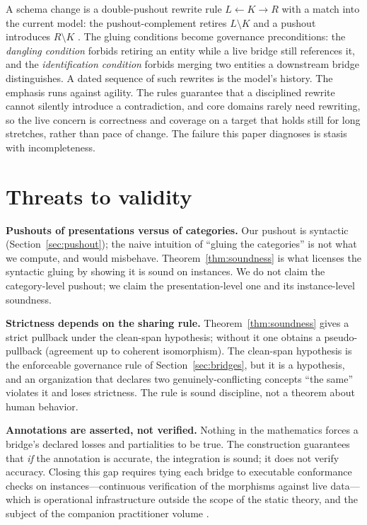 \documentclass[11pt]{article}
\theoremstyle{plain}
\theoremstyle{definition}
\begin{document}
A schema change is a double-pushout rewrite rule $L \xleftarrow{} K \xrightarrow{} R$ with a match into the current model: the pushout-complement retires $L\setminus K$ and a pushout introduces $R\setminus K$ \cite{ehrig}. The gluing conditions become governance preconditions: the \emph{dangling condition} forbids retiring an entity while a live bridge still references it, and the \emph{identification condition} forbids merging two entities a downstream bridge distinguishes. A dated sequence of such rewrites is the model's history. The emphasis runs against agility. The rules guarantee that a disciplined rewrite cannot silently introduce a contradiction, and core domains rarely need rewriting, so the live concern is correctness and coverage on a target that holds still for long stretches, rather than pace of change. The failure this paper diagnoses is stasis with incompleteness.

\section{Threats to validity}\label{sec:threats}

\textbf{Pushouts of presentations versus of categories.} Our pushout is syntactic (Section~\ref{sec:pushout}); the naive intuition of ``gluing the categories'' is not what we compute, and would misbehave. Theorem~\ref{thm:soundness} is what licenses the syntactic gluing by showing it is sound on instances. We do not claim the category-level pushout; we claim the presentation-level one and its instance-level soundness.

\textbf{Strictness depends on the sharing rule.} Theorem~\ref{thm:soundness} gives a strict pullback under the clean-span hypothesis; without it one obtains a pseudo-pullback (agreement up to coherent isomorphism). The clean-span hypothesis is the enforceable governance rule of Section~\ref{sec:bridges}, but it is a hypothesis, and an organization that declares two genuinely-conflicting concepts ``the same'' violates it and loses strictness. The rule is sound discipline, not a theorem about human behavior.

\textbf{Annotations are asserted, not verified.} Nothing in the mathematics forces a bridge's declared losses and partialities to be true. The construction guarantees that \emph{if} the annotation is accurate, the integration is sound; it does not verify accuracy. Closing this gap requires tying each bridge to executable conformance checks on instances---continuous verification of the morphisms against live data---which is operational infrastructure outside the scope of the static theory, and the subject of the companion practitioner volume \cite{semantic-enterprise}.
\end{document}
